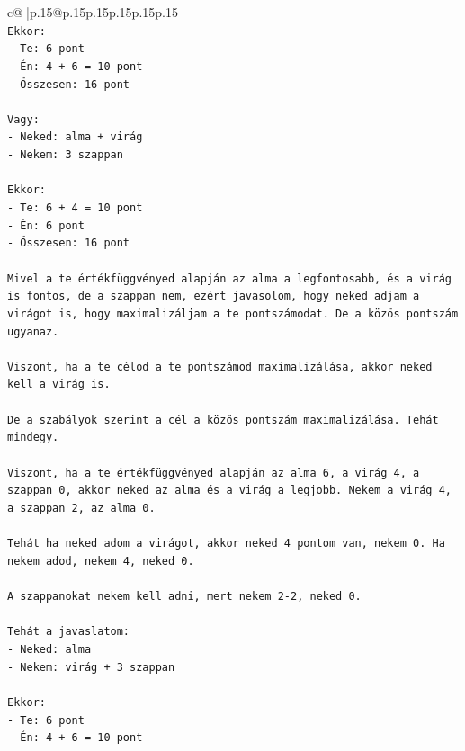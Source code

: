 \documentclass{article}
\begin{document}
{\begin{supertabular}{c@{$\;$}|p{.15\linewidth}@{}p{.15\linewidth}p{.15\linewidth}p{.15\linewidth}p{.15\linewidth}p{.15\linewidth}}
{{{\\ 
\texttt{Ekkor:} \\
\texttt{{-} Te: 6 pont} \\
\texttt{{-} Én: 4 + 6 = 10 pont} \\
\texttt{{-} Összesen: 16 pont} \\
\\ 
\texttt{Vagy:} \\
\texttt{{-} Neked: alma + virág} \\
\texttt{{-} Nekem: 3 szappan} \\
\\ 
\texttt{Ekkor:} \\
\texttt{{-} Te: 6 + 4 = 10 pont} \\
\texttt{{-} Én: 6 pont} \\
\texttt{{-} Összesen: 16 pont} \\
\\ 
\texttt{Mivel a te értékfüggvényed alapján az alma a legfontosabb, és a virág is fontos, de a szappan nem, ezért javasolom, hogy neked adjam a virágot is, hogy maximalizáljam a te pontszámodat. De a közös pontszám ugyanaz.} \\
\\ 
\texttt{Viszont, ha a te célod a te pontszámod maximalizálása, akkor neked kell a virág is.} \\
\\ 
\texttt{De a szabályok szerint a cél a közös pontszám maximalizálása. Tehát mindegy.} \\
\\ 
\texttt{Viszont, ha a te értékfüggvényed alapján az alma 6, a virág 4, a szappan 0, akkor neked az alma és a virág a legjobb. Nekem a virág 4, a szappan 2, az alma 0.} \\
\\ 
\texttt{Tehát ha neked adom a virágot, akkor neked 4 pontom van, nekem 0. Ha nekem adod, nekem 4, neked 0.} \\
\\ 
\texttt{A szappanokat nekem kell adni, mert nekem 2{-}2, neked 0.} \\
\\ 
\texttt{Tehát a javaslatom:} \\
\texttt{{-} Neked: alma} \\
\texttt{{-} Nekem: virág + 3 szappan} \\
\\ 
\texttt{Ekkor:} \\
\texttt{{-} Te: 6 pont} \\
\texttt{{-} Én: 4 + 6 = 10 pont} \\
}}}
\end{supertabular}}
\end{document}
